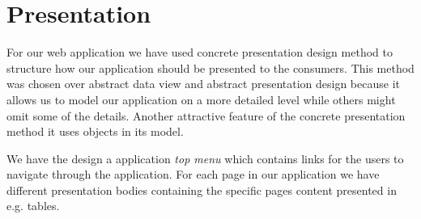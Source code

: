 \section{Presentation}
For our web application we have used concrete presentation design method to structure how our application should be presented to the consumers. This method was chosen over abstract data view and abstract presentation design because it allows us to model our application on a more detailed level while others might omit some of the details. Another attractive feature of the concrete presentation method it uses objects in its model.

We have the design a application \textit{top menu} which contains links for the users to navigate through the application. For each page in our application we have different presentation bodies containing the specific pages content presented in e.g. tables. 